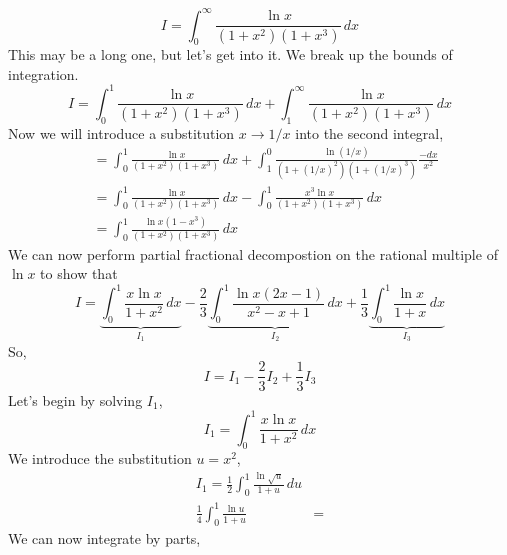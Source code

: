 \documentclass{article}
\begin{document}
\begin{equation*}
    I=\int_{0}^{\infty} \frac{\ln{x}}{(1+x^2)(1+x^3)}\,dx
\end{equation*}
This may be a long one, but let's get into it. We break up the bounds of integration. 
\begin{equation*}
    I=\int_{0}^{1} \frac{\ln{x}}{(1+x^2)(1+x^3)}\,dx+\int_{1}^{\infty} \frac{\ln{x}}{(1+x^2)(1+x^3)}\,dx
\end{equation*}
Now we will introduce a substitution $x \rightarrow 1/x$ into the second integral,
\begin{equation*}
    \begin{split}
       &= \int_{0}^{1} \frac{\ln{x}}{(1+x^2)(1+x^3)}\,dx+\int_{1}^{0} \frac{\ln(1/x)}{(1+\left(1/x\right)^2)(1+\left(1/x\right)^3)}\frac{-dx}{x^2} \\
        &=\int_{0}^{1} \frac{\ln{x}}{(1+x^2)(1+x^3)}\,dx-\int_{0}^{1} \frac{x^3\ln{x}}{(1+x^2)(1+x^3)}\,dx \\
        &=\int_{0}^{1} \frac{\ln{x}(1-x^3)}{(1+x^2)(1+x^3)}\,dx
    \end{split}
    
\end{equation*}
We can now perform partial fractional decompostion on the rational multiple of $\ln{x}$ to show that
\begin{equation*}
   I=\underbrace{\int_{0}^{1}\frac{x\ln{x}}{1+x^2}\,dx}_{I_1}-\frac{2}{3}\underbrace{\int_{0}^{1} \frac{\ln{x}(2x-1)}{x^2-x+1}\,dx}_{I_2}+\frac{1}{3}\underbrace{\int_{0}^{1}\frac{\ln{x}}{1+x}\,dx}_{I_3} 
\end{equation*}
So,
\begin{equation}
    \boxed{I=I_1-\frac{2}{3}I_2+\frac{1}{3}I_3}
\end{equation} \newpage
Let's begin by solving $I_1$,
\begin{equation*}
    I_1=\int_{0}^{1}\frac{x\ln{x}}{1+x^2}\,dx
\end{equation*}
We introduce the substitution $u=x^2$,
\begin{equation*}
\begin{split}
    I_1=\frac{1}{2}\int_{0}^{1} \frac{\ln{\sqrt{u}}}{1+u}\,du
    \\\frac{1}{4}\int_{0}^{1} \frac{\ln{u}}{1+u}&=\end{split}
\end{equation*}
We can now integrate by parts,
\end{document}
